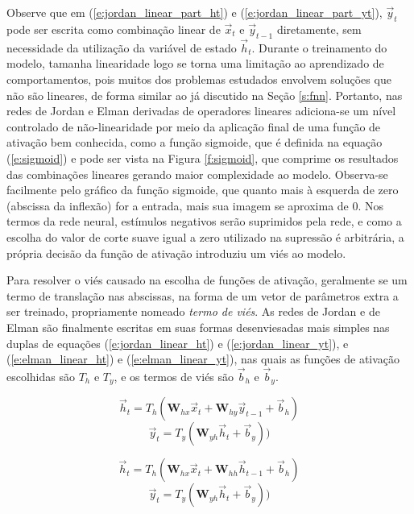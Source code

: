       Observe que em (\ref{e:jordan_linear_part_ht}) e (\ref{e:jordan_linear_part_yt}), $\vec{y}_t$ pode ser escrita como combinação linear de $\vec{x}_t$ e $\vec{y}_{t-1}$ diretamente, sem necessidade da utilização da variável de estado $\vec{h}_t$. Durante o treinamento do modelo, tamanha linearidade logo se torna uma limitação ao aprendizado de comportamentos, pois muitos dos problemas estudados envolvem soluções que não são lineares, de forma similar ao já discutido na Seção \ref{s:fnn}. Portanto, nas redes de Jordan e Elman derivadas de operadores lineares adiciona-se um nível controlado de não-linearidade por meio da aplicação final de uma função de ativação bem conhecida, como a função sigmoide, que é definida na equação (\ref{e:sigmoid}) e pode ser vista na Figura \ref{f:sigmoid}, que comprime os resultados das combinações lineares gerando maior complexidade ao modelo. Observa-se facilmente pelo gráfico da função sigmoide, que quanto mais à esquerda de zero (abscissa da inflexão) for a entrada, mais sua imagem se aproxima de 0. Nos termos da rede neural, estímulos negativos serão suprimidos pela rede, e como a escolha do valor de corte suave igual a zero utilizado na supressão é arbitrária, a própria decisão da função de ativação introduziu um viés ao modelo.

      Para resolver o viés causado na escolha de funções de ativação, geralmente se \DIFdelbegin {}\DIFdelend \DIFaddbegin {}\DIFaddend um termo de translação nas abscissas, na forma de um vetor de parâmetros extra a ser treinado, propriamente nomeado \textit{termo de viés}. As redes de Jordan e de Elman são finalmente escritas em suas formas desenviesadas mais simples nas duplas de equações (\ref{e:jordan_linear_ht}) e (\ref{e:jordan_linear_yt}), e (\ref{e:elman_linear_ht}) e (\ref{e:elman_linear_yt}), nas quais as funções de ativação escolhidas são $T_h$ e $T_y$, e os termos de viés são $\vec{b}_h$ e $\vec{b}_y$.

      \begin{equation} \label{e:jordan_linear_ht}
        \vec{h}_t = T_h(\boldsymbol{W}_{hx} \vec{x}_t + \boldsymbol{W}_{hy} \vec{y}_{t-1} + \vec{b}_h)
      \end{equation}
      \begin{equation} \label{e:jordan_linear_yt}
        \vec{y}_t = T_y(\boldsymbol{W}_{yh} \vec{h}_t + \vec{b}_y))
      \end{equation}

      \begin{equation} \label{e:elman_linear_ht}
        \vec{h}_t = T_h(\boldsymbol{W}_{hx} \vec{x}_t + \boldsymbol{W}_{hh} \vec{h}_{t-1} + \vec{b}_h)
      \end{equation}
      \begin{equation} \label{e:elman_linear_yt}
        \vec{y}_t = T_y(\boldsymbol{W}_{yh} \vec{h}_t + \vec{b}_y))
      \end{equation}

